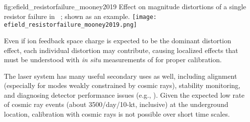 \begin{dunefigure}{fig:efield_resistorfailure_mooney2019}
{Effect on \efield magnitude distortions of a single  resistor failure in ~\cite{bib:mooney2019a}; shown as an example. 
}
\texttt{[image: efield\_resistorfailure\_mooney2019.png]}
\end{dunefigure}


Even if ion feedback space charge is expected to be the dominant \efield distortion effect,
each individual \efield distortion may contribute, causing localized effects that must be understood with \textit{in situ} measurements of \efield for proper calibration. 

The laser system has many useful secondary uses as well, including alignment (especially for modes weakly constrained by cosmic rays),
stability monitoring, and diagnosing detector performance issues
(e.g., ).  
Given the expected low rate of cosmic ray events (about 3500/day/10-kt, inclusive) at the underground location, calibration with cosmic rays is not possible over short time scales. 


